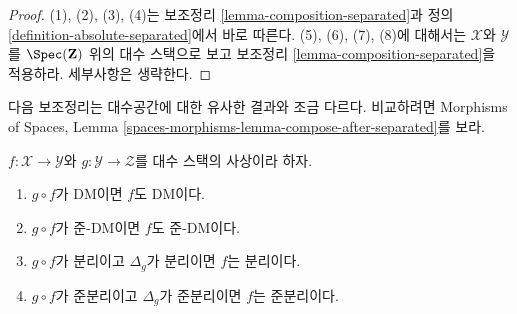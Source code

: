 \begin{proof}
(1), (2), (3), (4)는 보조정리
\ref{lemma-composition-separated}과 정의
\ref{definition-absolute-separated}에서 바로 따른다.
(5), (6), (7), (8)에 대해서는 $\mathcal{X}$와 $\mathcal{Y}$를
$\Spec(\mathbf{Z})$ 위의 대수 스택으로 보고 보조정리
\ref{lemma-composition-separated}을 적용하라. 세부사항은 생략한다.
\end{proof}

\noindent
다음 보조정리는 대수공간에 대한 유사한 결과와 조금 다르다.
비교하려면 Morphisms of Spaces, Lemma
\ref{spaces-morphisms-lemma-compose-after-separated}를 보라.

\begin{lemma}
\label{lemma-compose-after-separated}
$f : \mathcal{X} \to \mathcal{Y}$와
$g : \mathcal{Y} \to \mathcal{Z}$를 대수 스택의 사상이라 하자.
\begin{enumerate}
\item $g \circ f$가 DM이면 $f$도 DM이다.
\item $g \circ f$가 준-DM이면 $f$도 준-DM이다.
\item $g \circ f$가 분리이고 $\Delta_g$가 분리이면 $f$는 분리이다.
\item $g \circ f$가 준분리이고 $\Delta_g$가 준분리이면
$f$는 준분리이다.
\end{enumerate}
\end{lemma}

